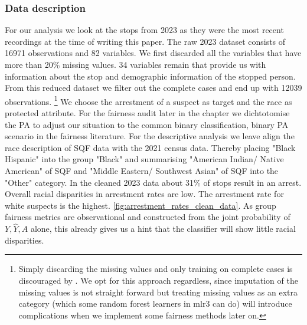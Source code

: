 \subsubsection*{Data description}
For our analysis we look at the stops from 2023 as they were the most recent recordings at the time of writing this paper. The raw 2023 dataset consists of 16971 observations and 82 variables. We first discarded all the variables that have more than 20\% missing values.
34 variables remain that provide us with information about the stop and demographic information of the stopped person. From this reduced dataset we filter out the complete cases and end up with 12039 observations.
\footnote{Simply discarding the missing values and only training on complete cases is discouraged by \cite{fernando2021}. We opt for this approach regardless, since imputation of the missing values is not straight forward
but treating missing values as an extra category (which some random forest learners in mlr3 can do) will introduce complications when we implement some fairness methods later on.}
We choose the arrestment of a suspect as target and the race as protected attribute. For the fairness audit later in the chapter we dichtotomise the PA to adjust our situation to the common binary classification, binary PA scenario in the fairness literature. For the descriptive analysis we leave align the race description of SQF data with the 2021 census data. Thereby placing "Black Hispanic" into the group "Black" and summarising "American Indian/ Native American" of SQF and "Middle Eastern/ Southwest Asian" of SQF into the "Other" category.  
In the cleaned 2023 data about 31\% of stops result in an arrest. Overall racial disparities in arrestment rates are low. The arrestment rate for white suspects is the highest. \autoref{fig:arrestment_rates_clean_data}. As group fairness metrics are observational and constructed from the joint probability of $Y, \hat{Y}, A$ alone, this already gives us a hint that the classifier will show little racial disparities.


